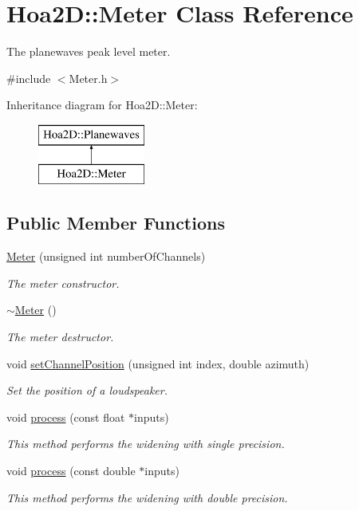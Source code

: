 \hypertarget{class_hoa2_d_1_1_meter}{\section{Hoa2\-D\-:\-:Meter Class Reference}
\label{class_hoa2_d_1_1_meter}
}


The planewaves peak level meter.  




{\ttfamily \#include $<$Meter.\-h$>$}

Inheritance diagram for Hoa2\-D\-:\-:Meter\-:\begin{figure}[H]
\begin{center}
\leavevmode
\includegraphics[height=2.000000cm]{class_hoa2_d_1_1_meter}
\end{center}
\end{figure}
\subsection*{Public Member Functions}
\begin{DoxyCompactItemize}
\item 
\hyperlink{class_hoa2_d_1_1_meter_a14d0584c4d3cd7fbfcbe73b7f9b072ce}{Meter} (unsigned int number\-Of\-Channels)
\begin{DoxyCompactList}\small\item\em The meter constructor. \end{DoxyCompactList}\item 
\hyperlink{class_hoa2_d_1_1_meter_a48276da266f600f4d24db748ff4ca046}{$\sim$\-Meter} ()
\begin{DoxyCompactList}\small\item\em The meter destructor. \end{DoxyCompactList}\item 
void \hyperlink{class_hoa2_d_1_1_meter_a6d6b2cbadbd05f9e731e22cd747f3008}{set\-Channel\-Position} (unsigned int index, double azimuth)
\begin{DoxyCompactList}\small\item\em Set the position of a loudspeaker. \end{DoxyCompactList}\item 
void \hyperlink{class_hoa2_d_1_1_meter_a1b05d443d17a910e7e9cc7b3f81badc6}{process} (const float $\ast$inputs)
\begin{DoxyCompactList}\small\item\em This method performs the widening with single precision. \end{DoxyCompactList}\item 
void \hyperlink{class_hoa2_d_1_1_meter_af523ed430333d4b861b117bda0bc6068}{process} (const double $\ast$inputs)
\begin{DoxyCompactList}\small\item\em This method performs the widening with double precision. \end{DoxyCompactList}\end{DoxyCompactItemize}


